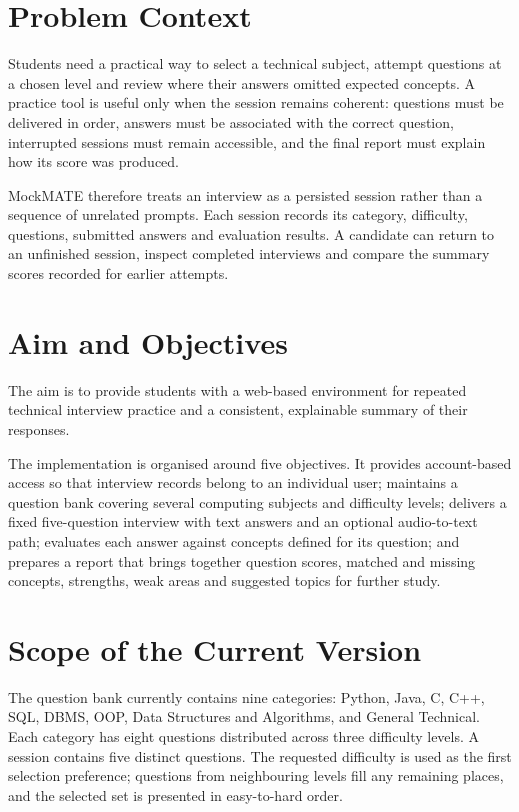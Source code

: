 \documentclass[12pt,a4paper,oneside]{report}
\begin{document}
\section{Problem Context}
Students need a practical way to select a technical subject, attempt questions at a chosen level and review where their answers omitted expected concepts. A practice tool is useful only when the session remains coherent: questions must be delivered in order, answers must be associated with the correct question, interrupted sessions must remain accessible, and the final report must explain how its score was produced.

MockMATE therefore treats an interview as a persisted session rather than a sequence of unrelated prompts. Each session records its category, difficulty, questions, submitted answers and evaluation results. A candidate can return to an unfinished session, inspect completed interviews and compare the summary scores recorded for earlier attempts.

\section{Aim and Objectives}
The aim is to provide students with a web-based environment for repeated technical interview practice and a consistent, explainable summary of their responses.

The implementation is organised around five objectives. It provides account-based access so that interview records belong to an individual user; maintains a question bank covering several computing subjects and difficulty levels; delivers a fixed five-question interview with text answers and an optional audio-to-text path; evaluates each answer against concepts defined for its question; and prepares a report that brings together question scores, matched and missing concepts, strengths, weak areas and suggested topics for further study.

\section{Scope of the Current Version}
The question bank currently contains nine categories: Python, Java, C, C++, SQL, DBMS, OOP, Data Structures and Algorithms, and General Technical. Each category has eight questions distributed across three difficulty levels. A session contains five distinct questions. The requested difficulty is used as the first selection preference; questions from neighbouring levels fill any remaining places, and the selected set is presented in easy-to-hard order.
\end{document}
